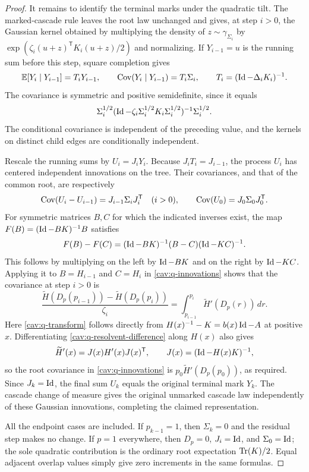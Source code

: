 \begin{proof}
It remains to identify the terminal marks under the quadratic tilt.
The marked-cascade rule leaves the root law unchanged and gives, at
step $i>0$, the Gaussian kernel obtained by multiplying the density
of $z\sim\gamma_{\Sigma_i}$ by
$\exp(\zeta_i(u+z)^{\mathsf T}K_i(u+z)/2)$ and normalizing.
If $Y_{i-1}=u$ is the running sum before this step, square completion
gives
\begin{equation}\label{cav:q-kernels}
 \mathbb E[Y_i\mid Y_{i-1}]=T_iY_{i-1},\qquad
 \operatorname{Cov}(Y_i\mid Y_{i-1})=T_i\Sigma_i,
 \qquad T_i=(\operatorname{Id}-\Delta_iK_i)^{-1}.
\end{equation}
The covariance is symmetric and positive semidefinite, since it equals
\[
 \Sigma_i^{1/2}
 (\operatorname{Id}-\zeta_i\Sigma_i^{1/2}K_i\Sigma_i^{1/2})^{-1}
 \Sigma_i^{1/2}.
\]
The conditional covariance is independent of the preceding value, and
the kernels on distinct child edges are conditionally independent.

Rescale the running sums by $U_i=J_iY_i$.  Because
$J_iT_i=J_{i-1}$, the process $U_i$ has centered independent
innovations on the tree.  Their covariances, and that of the common
root, are respectively
\begin{equation}\label{cav:q-innovations}
 \operatorname{Cov}(U_i-U_{i-1})=J_{i-1}\Sigma_iJ_i^{\mathsf T}\quad(i>0),
 \qquad \operatorname{Cov}(U_0)=J_0\Sigma_0J_0^{\mathsf T}.
\end{equation}
For symmetric matrices $B,C$ for which the indicated inverses exist,
the map $F(B)=(\operatorname{Id}-BK)^{-1}B$ satisfies
\begin{equation}\label{cav:q-resolvent-difference}
 F(B)-F(C)
 =(\operatorname{Id}-BK)^{-1}(B-C)(\operatorname{Id}-KC)^{-1}.
\end{equation}
This follows by multiplying on the left by $\operatorname{Id}-BK$ and on the
right by $\operatorname{Id}-KC$.  Applying it to $B=H_{i-1}$ and $C=H_i$
in \eqref{cav:q-innovations} shows that the covariance at step $i>0$
is
\[
 \frac{\widetilde H(D_p(p_{i-1}))-
       \widetilde H(D_p(p_i))}{\zeta_i}
 =\int_{p_{i-1}}^{p_i}\widetilde H'(D_p(r))\,dr.
\]
Here \eqref{cav:q-transform} follows directly from
$H(x)^{-1}-K=b(x)\operatorname{Id}-A$ at positive $x$.
Differentiating \eqref{cav:q-resolvent-difference} along $H(x)$
also gives
\begin{equation}\label{cav:q-root-covariance}
 \widetilde H'(x)=J(x)H'(x)J(x)^{\mathsf T},\qquad
 J(x)=(\operatorname{Id}-H(x)K)^{-1},
\end{equation}
so the root covariance in \eqref{cav:q-innovations} is
$p_0\widetilde H'(D_p(p_0))$, as required.
Since $J_k=\operatorname{Id}$, the final sum $U_k$ equals the original terminal
mark $Y_k$.  The cascade change of measure gives the original unmarked
cascade law independently of these Gaussian innovations, completing
the claimed representation.

All the endpoint cases are included.  If $p_{k-1}=1$, then
$\Sigma_k=0$ and the residual step makes no change.  If $p=1$
everywhere, then $D_p=0$, $J_i=\operatorname{Id}$, and $\Sigma_0=\operatorname{Id}$;
the sole quadratic contribution is the ordinary root expectation
$\operatorname{Tr}(K)/2$.  Equal adjacent overlap values simply give zero
increments in the same formulas.
\end{proof}

